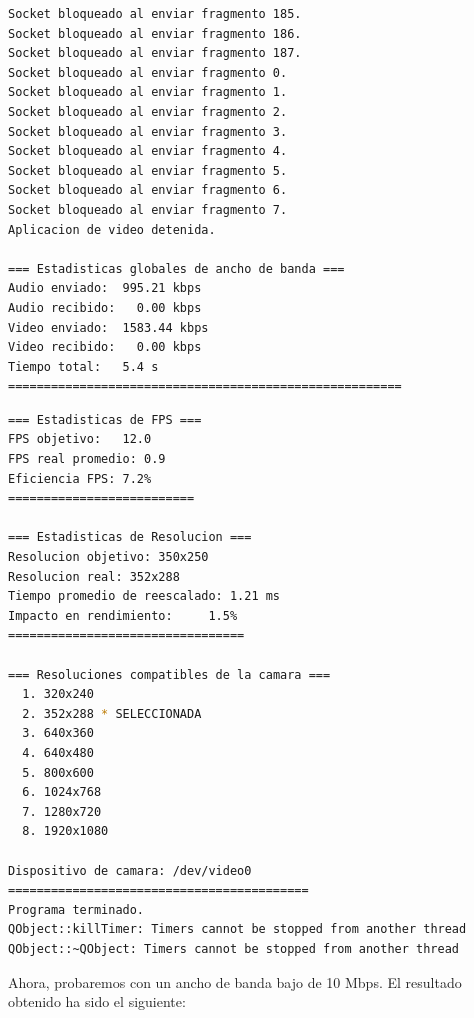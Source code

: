 \begin{adjustbox}{max width=\textwidth}
\begin{lstlisting}[language=bash,basicstyle=\ttfamily\scriptsize]
Socket bloqueado al enviar fragmento 185.
Socket bloqueado al enviar fragmento 186.
Socket bloqueado al enviar fragmento 187.
Socket bloqueado al enviar fragmento 0.
Socket bloqueado al enviar fragmento 1.
Socket bloqueado al enviar fragmento 2.
Socket bloqueado al enviar fragmento 3.
Socket bloqueado al enviar fragmento 4.
Socket bloqueado al enviar fragmento 5.
Socket bloqueado al enviar fragmento 6.
Socket bloqueado al enviar fragmento 7.
Aplicacion de video detenida.

=== Estadisticas globales de ancho de banda ===
Audio enviado:	995.21 kbps
Audio recibido:   0.00 kbps
Video enviado:	1583.44 kbps
Video recibido:   0.00 kbps
Tiempo total: 	5.4 s
=======================================================
\end{lstlisting}
\end{adjustbox}

\begin{adjustbox}{max width=\textwidth}
\begin{lstlisting}[language=bash,basicstyle=\ttfamily\scriptsize]
=== Estadisticas de FPS ===
FPS objetivo: 	12.0
FPS real promedio: 0.9
Eficiencia FPS:	7.2%
==========================

=== Estadisticas de Resolucion ===
Resolucion objetivo: 350x250
Resolucion real: 352x288
Tiempo promedio de reescalado: 1.21 ms
Impacto en rendimiento:    	1.5%
=================================

=== Resoluciones compatibles de la camara ===
  1. 320x240
  2. 352x288 * SELECCIONADA
  3. 640x360
  4. 640x480
  5. 800x600
  6. 1024x768
  7. 1280x720
  8. 1920x1080

Dispositivo de camara: /dev/video0
==========================================
Programa terminado.
QObject::killTimer: Timers cannot be stopped from another thread
QObject::~QObject: Timers cannot be stopped from another thread
\end{lstlisting}
\end{adjustbox}
\vspace{\baselineskip}

\newpage

Ahora, probaremos con un ancho de banda bajo de 10 Mbps. El resultado obtenido ha sido el siguiente:
\vspace{\baselineskip}

